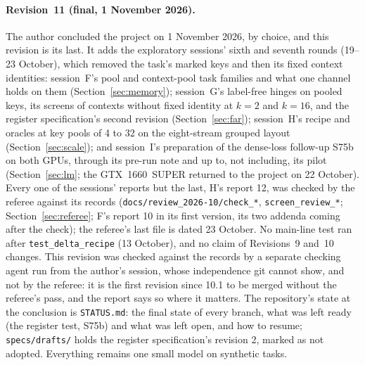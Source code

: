 \documentclass[11pt]{article}
\begin{document}
\paragraph{Revision~11 (final, 1 November 2026).} The author concluded the project on 1 November 2026, by choice, and this revision is its last. It adds the exploratory sessions' sixth and seventh rounds (19--23 October), which removed the task's marked keys and then its fixed context identities: session~F's pool and context-pool task families and what one channel holds on them (Section~\ref{sec:memory}); session~G's label-free hinges on pooled keys, its screens of contexts without fixed identity at $k = 2$ and $k = 16$, and the register specification's second revision (Section~\ref{sec:far}); session~H's recipe and oracles at key pools of 4 to 32 on the eight-stream grouped layout (Section~\ref{sec:scale}); and session~I's preparation of the dense-loss follow-up S75b on both GPUs, through its pre-run note and up to, not including, its pilot (Section~\ref{sec:lm}; the GTX~1660~SUPER returned to the project on 22 October). Every one of the sessions' reports but the last, H's report 12, was checked by the referee against its records (\texttt{docs/review\_2026-10/check\_*}, \texttt{screen\_review\_*}; Section~\ref{sec:referee}; F's report 10 in its first version, its two addenda coming after the check); the referee's last file is dated 23 October. No main-line test ran after \texttt{test\_delta\_recipe} (13 October), and no claim of Revisions~9 and~10 changes. This revision was checked against the records by a separate checking agent run from the author's session, whose independence git cannot show, and not by the referee: it is the first revision since 10.1 to be merged without the referee's pass, and the report says so where it matters. The repository's state at the conclusion is \texttt{STATUS.md}: the final state of every branch, what was left ready (the register test, S75b) and what was left open, and how to resume; \texttt{specs/drafts/} holds the register specification's revision 2, marked as not adopted. Everything remains one small model on synthetic tasks.
\end{document}
